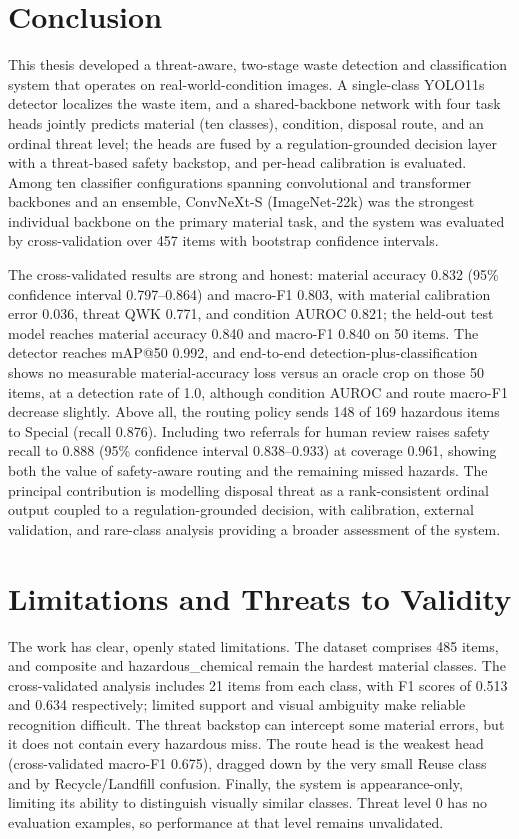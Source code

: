 \section{Conclusion}
This thesis developed a threat-aware, two-stage waste detection and classification system that operates on real-world-condition images. A single-class YOLO11s detector localizes the waste item, and a shared-backbone network with four task heads jointly predicts material (ten classes), condition, disposal route, and an ordinal threat level; the heads are fused by a regulation-grounded decision layer with a threat-based safety backstop, and per-head calibration is evaluated. Among ten classifier configurations spanning convolutional and transformer backbones and an ensemble, ConvNeXt-S (ImageNet-22k) was the strongest individual backbone on the primary material task, and the system was evaluated by cross-validation over 457 items with bootstrap confidence intervals.

The cross-validated results are strong and honest: material accuracy 0.832 (95\% confidence interval 0.797--0.864) and macro-F1 0.803, with material calibration error 0.036, threat QWK 0.771, and condition AUROC 0.821; the held-out test model reaches material accuracy 0.840 and macro-F1 0.840 on 50 items. The detector reaches mAP@50 0.992, and end-to-end detection-plus-classification shows no measurable material-accuracy loss versus an oracle crop on those 50 items, at a detection rate of 1.0, although condition AUROC and route macro-F1 decrease slightly. Above all, the routing policy sends 148 of 169 hazardous items to Special (recall 0.876). Including two referrals for human review raises safety recall to 0.888 (95\% confidence interval 0.838--0.933) at coverage 0.961, showing both the value of safety-aware routing and the remaining missed hazards. The principal contribution is modelling disposal threat as a rank-consistent ordinal output coupled to a regulation-grounded decision, with calibration, external validation, and rare-class analysis providing a broader assessment of the system.

\section{Limitations and Threats to Validity}
\label{sec:threats}
The work has clear, openly stated limitations. The dataset comprises 485 items, and composite and hazardous\_chemical remain the hardest material classes. The cross-validated analysis includes 21 items from each class, with F1 scores of 0.513 and 0.634 respectively; limited support and visual ambiguity make reliable recognition difficult. The threat backstop can intercept some material errors, but it does not contain every hazardous miss. The route head is the weakest head (cross-validated macro-F1 0.675), dragged down by the very small Reuse class and by Recycle/Landfill confusion. Finally, the system is appearance-only, limiting its ability to distinguish visually similar classes. Threat level 0 has no evaluation examples, so performance at that level remains unvalidated.

